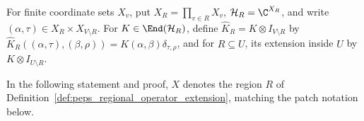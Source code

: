 \begin{definition}%
    \label{def:peps_regional_operator_extension}
    \leanok
    For finite coordinate sets $X_v$, put $X_R=\prod_{v\in R}X_v$,
    $\mathcal H_R=\C^{X_R}$, and write $(\alpha,\tau)\in X_R\times X_{V\setminus R}$.
    For $K\in\End(\mathcal H_R)$, define $\widehat K_R=K\otimes I_{V\setminus R}$ by
    $\widehat K_R((\alpha,\tau),(\beta,\rho))=K(\alpha,\beta)\delta_{\tau,\rho}$,
    and for $R\subseteq U$, its extension inside $U$ by $K\otimes I_{U\setminus R}$.
\end{definition}

In the following statement and proof, $X$ denotes the region $R$ of
Definition~\ref{def:peps_regional_operator_extension}, matching the patch
notation below.

